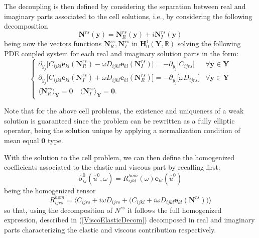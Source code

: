 The decoupling is then defined by considering the separation between real and imaginary parts associated to the cell solutions, i.e., by considering the following decomposition
\begin{equation*}
    \mathbf{N}^{rs}(\mathbf{y}) = \mathbf{N}_R^{rs}(\mathbf{y}) + i\mathbf{N}_I^{rs}(\mathbf{y})
\end{equation*}
being now the vectors functions $\mathbf{N}_R^{rs}, \mathbf{N}_I^{rs}$ in $\mathbf{H}^1_{0}(\mathbf{Y},\mathbb{R})$ solving the following PDE coupled system for each real and imaginary solution parts in the form:
\begin{equation*}
    \left \{
    \begin{array}{cc}
        \partial_{y_j} \big[ C_{ijkl} \mathbf{e}_{kl}(\mathbf{N}^{rs}_R) -\omega D_{ijkl} \mathbf{e}_{kl}(\mathbf{N}^{rs}_I) \big] = - \partial_{y_j} \big[ C_{ijrs} \big] & \forall \mathbf{y} \in \mathbf{Y} \\
        \partial_{y_j} \big[ C_{ijkl} \mathbf{e}_{kl}(\mathbf{N}^{rs}_I) +\omega D_{ijkl} \mathbf{e}_{kl}(\mathbf{N}^{rs}_R) \big] = - \partial_{y_j} \big[ \omega D_{ijrs} \big] & \forall \mathbf{y} \in \mathbf{Y} \\
        \big \langle \mathbf{N}^{rs}_R \big \rangle_{\mathbf{Y}}= \mathbf{0} \quad \big \langle \mathbf{N}^{rs}_I \big \rangle_{\mathbf{Y}} = \mathbf{0}.  &
    \end{array}
    \right.
\end{equation*}
\begin{rem}
Note that for the above cell problems, the existence and uniqueness of a weak solution is guaranteed since the problem can be rewritten as a fully elliptic operator, being the solution unique by applying a normalization condition of mean equal $\mathbf{0}$ type.
\end{rem}
With the solution to the cell problem, we can then define the homogenized coefficients associated to the elastic and viscous part by recalling first:
\begin{equation*}
    \hat{\sigma}_{ij}^0 (\hat{u}^0,\omega) = R_{ijkl}^{hom} (\omega) \mathbf{e}_{kl}(\hat{u}^0)
\end{equation*}
being the homogenized tensor
\begin{equation*}
    R^{hom}_{ijrs}= \big \langle  C_{ijrs} + i\omega D_{ijrs} + \big( C_{ijkl} + i \omega D_{ijkl} \mathbf{e}_{kl}(\mathbf{N}^{rs}) \big) \big \rangle  
\end{equation*}
so that, using the decomposition of $N^{rs}$ it follows the full homogenized expression, described in (\ref{ViscoElasticDecom}) decomposed in real and imaginary parts characterizing the elastic and viscous contribution respectively.
